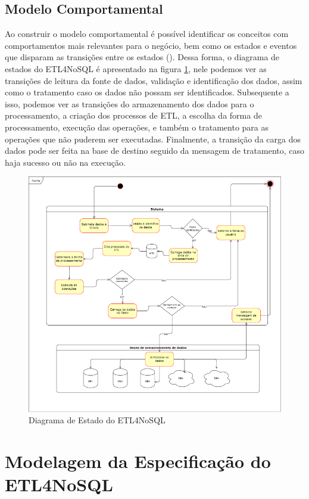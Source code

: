 \subsection{Modelo Comportamental}

Ao construir o modelo comportamental é possível identificar os conceitos com comportamentos mais relevantes para o negócio, bem como os estados e eventos que disparam as transições entre os estados (\cite{itana:2005}). Dessa forma, o diagrama de estados do ETL4NoSQL é apresentado na figura \ref{diagrama_estado}, nele podemos ver as transições de leitura da fonte de dados, validação e identificação dos dados, assim como o tratamento caso os dados não possam ser identificados. Subsequente a isso, podemos ver as transições do armazenamento dos dados para o processamento, a criação dos processos de ETL, a escolha da forma de processamento, execução das operações, e também o tratamento para as operações que não puderem ser executadas. Finalmente, a transição da carga dos dados pode ser feita na base de destino seguido da mensagem de tratamento, caso haja sucesso ou não na execução.

\begin{figure}[h!]
	\centering
	\includegraphics[scale=0.6]{fig/diagrama_estado.png}
	\caption{Diagrama de Estado do ETL4NoSQL}
	\label{diagrama_estado}
\end{figure}

\section{Modelagem da Especificação do ETL4NoSQL}

